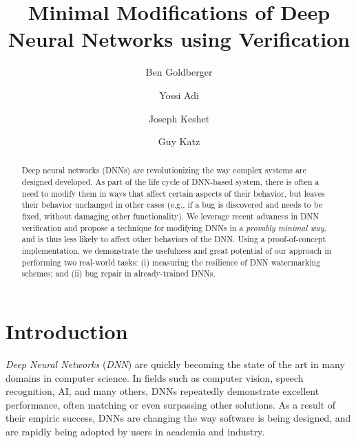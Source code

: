 \documentclass{easychair}
\begin{document}
\title{Minimal Modifications of Deep Neural Networks using Verification}
\author{
Ben Goldberger \and
Yossi Adi \and
Joseph Keshet \and
Guy Katz
}

\maketitle


\begin{abstract}
  Deep neural networks (DNNs) are revolutionizing the way complex
  systems are designed developed. As part of the life cycle of
  DNN-based system, there is often a need to modify them in ways that
  affect certain aspects of their behavior, but leaves their behavior
  unchanged in other cases (e.g., if a bug is discovered and needs to
  be fixed, without damaging other functionality). We leverage recent
  advances in DNN verification and propose a technique for modifying
  DNNs in a \emph{provably minimal way}, and is thus less likely to
  affect other behaviors of the DNN. Using a proof-of-concept
  implementation, we demonstrate the usefulness and great potential of
  our approach in performing two real-world tasks: (i) measuring the
  resilience of DNN watermarking schemes; and (ii) bug repair in
  already-trained DNNs.
\end{abstract}

\section{Introduction}
\label{sec:introduction}


\emph{Deep Neural Networks} (\emph{DNN}) are quickly becoming the
state of the art in many domains in computer science.  In fields such
as computer vision, speech recognition, AI, and many others, DNNs
repeatedly demonstrate excellent performance, often matching or even
surpassing other solutions.  As a result of their empiric success,
DNNs are changing the way software is being designed, and are rapidly
being adopted by users in academia and industry.
\end{document}
